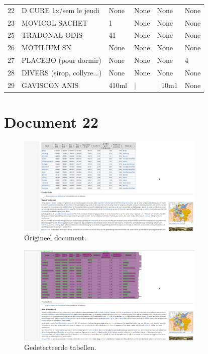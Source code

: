\begin{tabular}{llllll}
22 &              D CURE 1x/sem le jeudi &   None &  None &    None &  None \\
23 &                      MOVICOL SACHET &      1 &  None &    None &  None \\
25 &                       TRADONAL ODIS &     41 &  None &    None &  None \\
26 &                         MOTILIUM SN &   None &  None &    None &  None \\
27 &               PLACEBO (pour dormir) &   None &  None &    None &     4 \\
28 &          DIVERS (sirop, collyre...) &   None &  None &    None &  None \\
29 &                       GAVISCON ANIS &  410ml &     | &  | 10m1 &  None \\
\bottomrule
\end{tabular}
\section{Document 22}

\begin{figure}[H]
    \centering
    \includegraphics[width=0.8\textwidth]{test-resultaten/22/original.png}
    \caption{Origineel document.}
\end{figure}

\begin{figure}[H]
    \centering
    \includegraphics[width=0.8\textwidth]{test-resultaten/22/detected_tables.png}
    \caption{Gedetecteerde tabellen.}
\end{figure}

